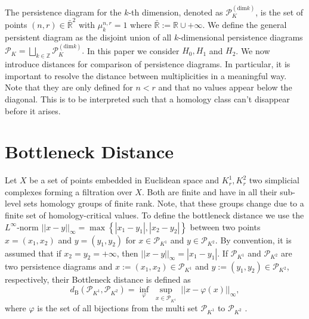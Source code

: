 \documentclass[runningheads]{llncs}
\begin{document}
The persistence diagram for the $k$-th dimension, denoted as $\mathcal{P}^{(\text{dim} k)}_{K}$, is the set of points $(n,r) \in \mathbb{\bar{R}}^2$ with $\mu^{n,r}_k = 1$ where $\bar{\mathbb{R}} := \mathbb{R} \cup +\infty$. We define the general persistent diagram as the disjoint union of all $k$-dimensional persistence diagrams $\mathcal{P}_K = \bigsqcup_{k \in \mathbb{Z}} \mathcal{P}^{(\text{dim} k)}_{K}.$ In this paper we consider $H_0, H_1$ and $H_2$. We now introduce distances for comparison of persistence diagrams. In particular, it is important to resolve the distance between multiplicities in a meaningful way. Note that they are only defined for $n < r$ and that no values appear below the diagonal. This is to be interpreted such that a homology class can't disappear before it arises.

\section{Bottleneck Distance}
Let $X$ be a set of points embedded in Euclidean space and $K_{r}^1, K_{r}^2$ two simplicial complexes forming a filtration over $X$. Both are finite and have in all their sub-level sets homology groups of finite rank. Note, that these groups change due to a finite set of homology-critical values. To define the bottleneck distance we use the $L^\infty$-norm $||x-y||_\infty = \max\left\{|x_1-y_1|,|x_2-y_2|\right\}$ between two points $x = (x_1,x_2)$ and $y = (y_1,y_2)$ for $x \in \mathcal{P}_{K^1}$ and $y \in \mathcal{P}_{K^2}$. By convention, it is assumed that if $x_2=y_2=+\infty$, then $||x-y||_\infty = |x_1-y_1|$. If $\mathcal{P}_{K^1}$ and $\mathcal{P}_{K^2}$ are two persistence diagrams and $x:=(x_1,x_2) \in \mathcal{P}_{K^1}$ and $y := (y_1,y_2)\in \mathcal{P}_{K^2}$, respectively, their Bottleneck distance is defined as
\begin{equation}
d_\text{B}(\mathcal{P}_{K^1},\mathcal{P}_{K^2})=\inf_{\varphi} \; \sup_{x\in \mathcal{P}_{K^1}}\;||x-\varphi(x)||_\infty,
\end{equation}
where $\varphi$ is the set of all bijections from the multi set $\mathcal{P}_{K^1}$ to $\mathcal{P}_{K^2}$ \cite{boissonnat2018geometric}.
\end{document}
